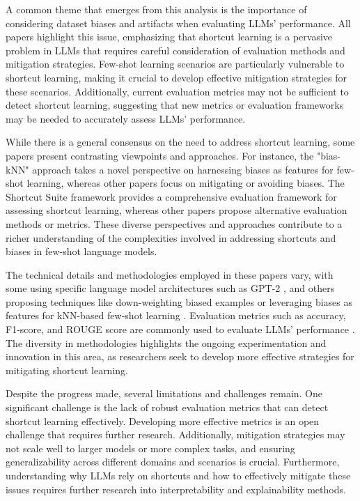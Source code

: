\documentclass[conference]{IEEEtran}
\begin{document}
A common theme that emerges from this analysis is the importance of considering dataset biases and artifacts when evaluating LLMs' performance. All papers highlight this issue, emphasizing that shortcut learning is a pervasive problem in LLMs that requires careful consideration of evaluation methods and mitigation strategies. Few-shot learning scenarios are particularly vulnerable to shortcut learning, making it crucial to develop effective mitigation strategies for these scenarios. Additionally, current evaluation metrics may not be sufficient to detect shortcut learning, suggesting that new metrics or evaluation frameworks may be needed to accurately assess LLMs' performance.

While there is a general consensus on the need to address shortcut learning, some papers present contrasting viewpoints and approaches. For instance, the "bias-kNN" approach \cite{b3} takes a novel perspective on harnessing biases as features for few-shot learning, whereas other papers focus on mitigating or avoiding biases. The Shortcut Suite framework \cite{b4} provides a comprehensive evaluation framework for assessing shortcut learning, whereas other papers propose alternative evaluation methods or metrics. These diverse perspectives and approaches contribute to a richer understanding of the complexities involved in addressing shortcuts and biases in few-shot language models.

The technical details and methodologies employed in these papers vary, with some using specific language model architectures such as GPT-2 \cite{b3, b4}, and others proposing techniques like down-weighting biased examples \cite{b5} or leveraging biases as features for kNN-based few-shot learning \cite{b3}. Evaluation metrics such as accuracy, F1-score, and ROUGE score are commonly used to evaluate LLMs' performance \cite{b2, b4}. The diversity in methodologies highlights the ongoing experimentation and innovation in this area, as researchers seek to develop more effective strategies for mitigating shortcut learning.

Despite the progress made, several limitations and challenges remain. One significant challenge is the lack of robust evaluation metrics that can detect shortcut learning effectively. Developing more effective metrics is an open challenge that requires further research. Additionally, mitigation strategies may not scale well to larger models or more complex tasks, and ensuring generalizability across different domains and scenarios is crucial. Furthermore, understanding why LLMs rely on shortcuts and how to effectively mitigate these issues requires further research into interpretability and explainability methods.
\end{document}
